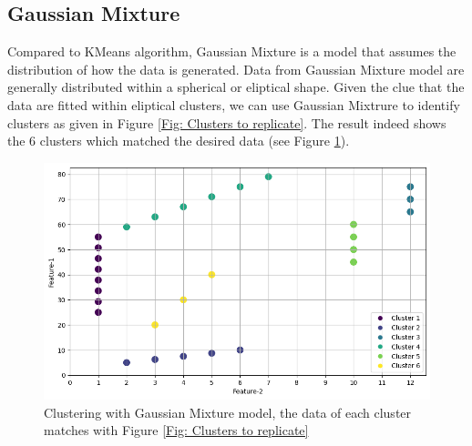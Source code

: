 \subsection{Gaussian Mixture}
Compared to KMeans algorithm, Gaussian Mixture \cite{reynolds2009gaussian} is a model that assumes the distribution of how the data is generated.
Data from Gaussian Mixture model are generally distributed within a spherical or eliptical shape.
Given the clue that the data are fitted within eliptical clusters, we can use Gaussian Mixtrure to identify clusters as given in Figure \ref{Fig: Clusters to replicate}.
The result indeed shows the 6 clusters which matched the desired data (see Figure \ref{Fig: GaussMix6}).

\begin{figure}
    \centering
    \includegraphics[width=\textwidth]{Appendices/GaussMix6.png}
    \caption{Clustering with Gaussian Mixture model, the data of each cluster matches with Figure \ref{Fig: Clusters to replicate}}
    \label{Fig: GaussMix6}
\end{figure}
